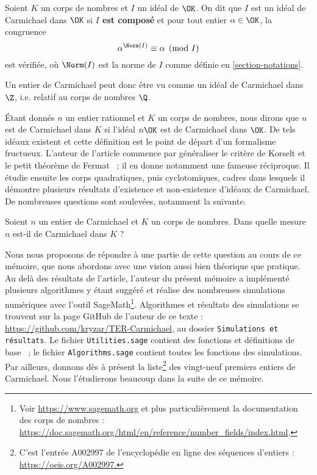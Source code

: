\begin{definition} Soient $K$ un corps de nombres et $I$ un idéal de $\OK$. On dit que $I$ est un idéal de Carmichael dans $\OK$ si \textbf{$I$ est composé} et pour tout entier $\alpha \in \OK$, la congruence \[\alpha^{\Norm(I)} \equiv \alpha \pmod{I}\] est vérifiée, où $\Norm(I)$ est la norme de $I$ comme définie en \ref{section-notations}.
\end{definition}

\begin{remarque}
	Un entier de Carmichael peut donc être vu comme un idéal de Carmichael dans $\Z$, i.e. relatif au corps de nombres $\Q$.
\end{remarque}

Étant donnés $n$ un entier rationnel et $K$ un corps de nombres, nous dirons que $n$ est de Carmichael dans $K$ si l'idéal $n\OK$ est de Carmichael dans $\OK$. De tels idéaux existent et cette définition est le point de départ d'un formalisme fructueux. L'auteur de l'article commence par généraliser le critère de Korselt et le petit théorème de Fermat ~; il en donne notamment une fameuse réciproque. Il étudie ensuite les corps quadratiques, puis cyclotomiques, cadres dans lesquels il démontre plusieurs résultats d'existence et non-existence d'idéaux de Carmichael. De nombreuses questions sont soulevées, notamment la suivante. 

\begin{question}\label{question-centrale}Soient $n$ un entier de Carmichael et $K$ un corps de nombres. Dans quelle mesure $n$ est-il de Carmichael dans $K$ ?
\end{question}

Nous nous proposons de répondre à une partie de cette question au cours de ce mémoire, que nous abordons avec une vision aussi bien théorique que pratique. Au delà des résultats de l'article, l'auteur du présent mémoire a implémenté plusieurs algorithmes y étant suggéré et réalise des nombreuses simulations numériques avec l'outil SageMath\footnote{Voir \url{https://www.sagemath.org} et plus particulièrement la documentation des corps de nombres : \url{https://doc.sagemath.org/html/en/reference/number\_fields/index.html}.}. Algorithmes et résultats des simulations se trouvent sur la page GitHub de l'auteur de ce texte : \url{https://github.com/kryzar/TER-Carmichael}, au dossier \texttt{Simulations et résultats}. Le fichier \texttt{Utilities.sage} contient des fonctions et définitions de base ~; le fichier \texttt{Algorithms.sage} contient toutes les fonctions des simulations. Par ailleurs, donnons dès à présent la liste\footnote{C’est l'entrée A002997 de l'encyclopédie en ligne des séquences d’entiers : \url{https://oeis.org/A002997.}} des vingt-neuf premiers entiers de Carmichael. Nous l'étudierons beaucoup dans la suite de ce mémoire.

